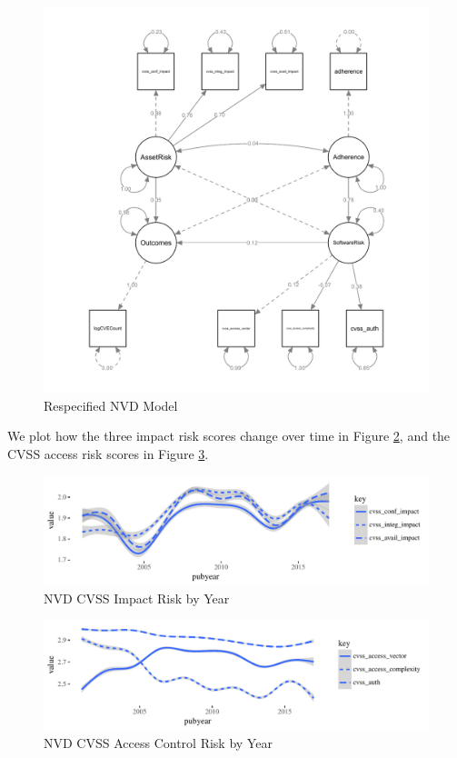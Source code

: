 \begin{figure}
	\centering
	\includegraphics[width=\textwidth]{NVD_Respecified_SEM_Model.pdf}
	\caption{Respecified NVD Model}
	\label{fig:nvd_model_respecified_estimates}
\end{figure}

We plot how the three impact risk scores change over time in Figure \ref{fig:nvd_vulns_impact}, and the CVSS access risk scores in Figure \ref{fig:nvd_vulns_auth}. 	
		
\begin{figure}
	\centering
	\includegraphics[width=\columnwidth]{nvd_cvss_impact}
	\caption{NVD CVSS Impact Risk by Year}
	\label{fig:nvd_vulns_impact}
\end{figure}

\begin{figure}
	\centering
	\includegraphics[width=\columnwidth]{nvd_cvss_auth}
	\caption{NVD CVSS Access Control Risk by Year}
	\label{fig:nvd_vulns_auth}
\end{figure}

